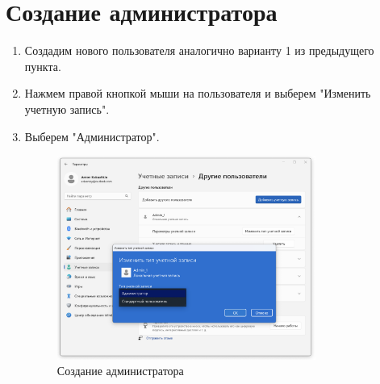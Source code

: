 \documentclass[a4paper, 14pt]{report}
\begin{document}
\section{Создание администратора}
\begin{enumerate}
    \item Создадим нового пользователя аналогично варианту 1 из предыдущего пункта.
    \item Нажмем правой кнопкой мыши на пользователя и выберем "Изменить учетную запись".
    \item Выберем "Администратор".
          {
          \begin{figure}[H]
              \centering
              \includegraphics[width=0.8\textwidth]{../images/create_admin.png}
              \caption{Создание администратора}
          \end{figure}
          }
\end{enumerate}
\end{document}
